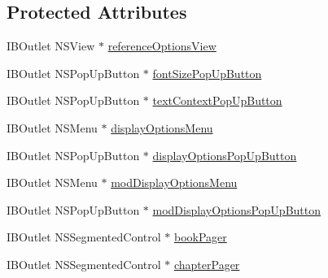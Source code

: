 \subsection*{Protected Attributes}
\begin{DoxyCompactItemize}
\item 
I\-B\-Outlet N\-S\-View $\ast$ \hyperlink{interface_module_commons_view_controller_a5fec23c43789a702edfa7fd6a316e975}{reference\-Options\-View}
\item 
I\-B\-Outlet N\-S\-Pop\-Up\-Button $\ast$ \hyperlink{interface_module_commons_view_controller_aaf852b248b2a3bf337e36d4f5111d385}{font\-Size\-Pop\-Up\-Button}
\item 
I\-B\-Outlet N\-S\-Pop\-Up\-Button $\ast$ \hyperlink{interface_module_commons_view_controller_aa9c3b8207bee7505ddab68b9819a605d}{text\-Context\-Pop\-Up\-Button}
\item 
I\-B\-Outlet N\-S\-Menu $\ast$ \hyperlink{interface_module_commons_view_controller_a594de261db42d4f611ab441bcc9d5794}{display\-Options\-Menu}
\item 
I\-B\-Outlet N\-S\-Pop\-Up\-Button $\ast$ \hyperlink{interface_module_commons_view_controller_aedd89b0adbff85596caa3bb89d861a82}{display\-Options\-Pop\-Up\-Button}
\item 
I\-B\-Outlet N\-S\-Menu $\ast$ \hyperlink{interface_module_commons_view_controller_a90317416de9b51ea1217cf14db302faf}{mod\-Display\-Options\-Menu}
\item 
I\-B\-Outlet N\-S\-Pop\-Up\-Button $\ast$ \hyperlink{interface_module_commons_view_controller_a29d3b894571e02189c9b481c18493535}{mod\-Display\-Options\-Pop\-Up\-Button}
\item 
I\-B\-Outlet N\-S\-Segmented\-Control $\ast$ \hyperlink{interface_module_commons_view_controller_a207c8dd482865359108baf1e4af7ed9e}{book\-Pager}
\item 
I\-B\-Outlet N\-S\-Segmented\-Control $\ast$ \hyperlink{interface_module_commons_view_controller_ae14dc3e19c6b6c72924df1eb5f21c682}{chapter\-Pager}
\end{DoxyCompactItemize}
